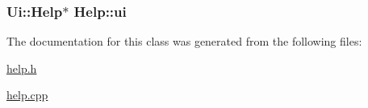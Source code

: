 \subsubsection[{\texorpdfstring{ui}{ui}}]{\setlength{\rightskip}{0pt plus 5cm}Ui\+::\+Help$\ast$ Help\+::ui\hspace{0.3cm}{\ttfamily [private]}}\hypertarget{classHelp_a2b64cd3a7d7dc1e6d44c575d4df6dc0d}{}\label{classHelp_a2b64cd3a7d7dc1e6d44c575d4df6dc0d}


The documentation for this class was generated from the following files\+:\begin{DoxyCompactItemize}
\item 
\hyperlink{help_8h}{help.\+h}\item 
\hyperlink{help_8cpp}{help.\+cpp}\end{DoxyCompactItemize}
